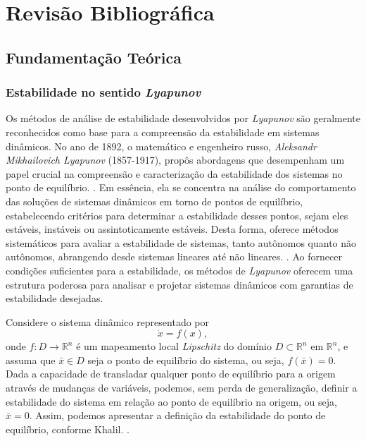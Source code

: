\chapter{Revisão Bibliográfica} \label{cap2}

\section{Fundamentação Teórica}

\subsection{Estabilidade no sentido \textit{Lyapunov}}

Os métodos de análise de estabilidade desenvolvidos por \textit{Lyapunov} são geralmente reconhecidos como base para a compreensão da estabilidade em sistemas dinâmicos. No ano de 1892, o matemático e engenheiro russo, \textit{Aleksandr Mikhailovich Lyapunov} (1857-1917), propôs abordagens que desempenham um papel crucial na compreensão e caracterização da estabilidade dos sistemas no ponto de equilíbrio. \cite{lyapunov1892}. Em essência, ela se concentra na análise do comportamento das soluções de sistemas dinâmicos em torno de pontos de equilíbrio, estabelecendo critérios para determinar a estabilidade desses pontos, sejam eles estáveis, instáveis ou assintoticamente estáveis. Desta forma, oferece métodos sistemáticos para avaliar a estabilidade de sistemas, tanto autônomos quanto não autônomos, abrangendo desde sistemas lineares até não lineares. \cite{khalil2002}. Ao fornecer condições suficientes para a estabilidade, os métodos de \textit{Lyapunov} oferecem uma estrutura poderosa para analisar e projetar sistemas dinâmicos com garantias de estabilidade desejadas.

Considere o sistema dinâmico representado por \begin{equation}\dot{x} = f(x), \end{equation} onde $f: D \rightarrow \mathbb{R}^n$ é um mapeamento local \textit{Lipschitz} do domínio $D \subset \mathbb{R}^n$ em $\mathbb{R}^n$, e assuma que $\bar{x} \in D$ seja o ponto de equilíbrio do sistema, ou seja, $f(\bar{x}) = 0$. Dada a capacidade de transladar qualquer ponto de equilíbrio para a origem através de mudanças de variáveis, podemos, sem perda de generalização, definir a estabilidade do sistema em relação ao ponto de equilíbrio na origem, ou seja, $\bar{x} = 0$. Assim, podemos apresentar a definição da estabilidade do ponto de equilíbrio, conforme Khalil. \cite{khalil2002}.

